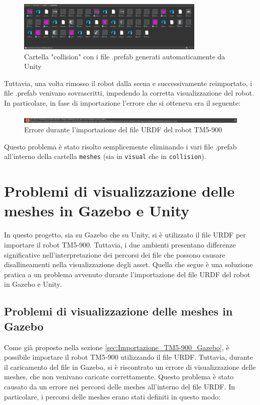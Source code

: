 \documentclass[11pt]{report}
\begin{document}
\begin{figure} [H]
    \centering
    \includegraphics[width=0.8\textwidth]{images/prefab_collision.PNG}
    \caption{Cartella "collision" con i file .prefab generati automaticamente da Unity}
    \label{fig:collision_prefab}
\end{figure} 

Tuttavia, una volta rimosso il robot dalla scena e successivamente reimportato, i file .prefab venivano sovrascritti, impedendo la corretta visualizzazione del robot. In particolare, in fase di importazione l'errore che si otteneva era il seguente:



\begin{figure} [H]
    \centering
    \includegraphics[width=1\textwidth]{images/errore_prefab.PNG}
    \caption{Errore durante l'importazione del file URDF del robot TM5-900}
    \label{fig:errore_prefab}
\end{figure}

Questo problema è stato risolto semplicemente eliminando i vari file .prefab all'interno della cartella \texttt{meshes} (sia in \texttt{visual} che in \texttt{collision}).


\section{Problemi di visualizzazione delle meshes in Gazebo e Unity}
\label{sec:visualizzazione_meshes}
In questo progetto, sia su Gazebo che su Unity, si è utilizzato il file URDF per importare il robot TM5-900. Tuttavia, i due ambienti presentano differenze significative nell’interpretazione dei percorsi dei file che possono causare disallineamenti nella visualizzazione degli asset.
Quella che segue è una soluzione pratica a un problema avvenuto durante l'importazione del file URDF del robot in Gazebo e Unity.

\subsection{Problemi di visualizzazione delle meshes in Gazebo}
\label{sec:Problemi_visualizzazione_Gazebo}
Come già proposto nella sezione \ref{sec:Importazione_TM5-900_Gazebo}, è possibile importare il robot TM5-900 utilizzando il file URDF. Tuttavia, durante il caricamento del file in Gazebo, si è riscontrato un errore di visualizzazione delle meshes, che non venivano caricate correttamente. Questo problema è stato causato da un errore nei percorsi delle meshes all'interno del file URDF. In particolare, i percorsi delle meshes erano stati definiti in questo modo:
\end{document}
